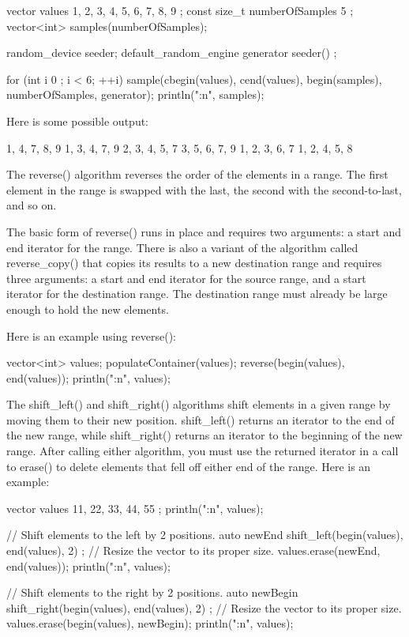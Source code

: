 \begin{cpp}
vector values { 1, 2, 3, 4, 5, 6, 7, 8, 9 };
const size_t numberOfSamples { 5 };
vector<int> samples(numberOfSamples);

random_device seeder;
default_random_engine generator { seeder() };

for (int i { 0 }; i < 6; ++i) {
    sample(cbegin(values), cend(values), begin(samples),
        numberOfSamples, generator);
    println("{:n}", samples);
}
\end{cpp}

Here is some possible output:

\begin{shell}
1, 4, 7, 8, 9
1, 3, 4, 7, 9
2, 3, 4, 5, 7
3, 5, 6, 7, 9
1, 2, 3, 6, 7
1, 2, 4, 5, 8
\end{shell}


The reverse() algorithm reverses the order of the elements in a range. The first element in the range is swapped with the last, the second with the second-to-last, and so on.

The basic form of reverse() runs in place and requires two arguments: a start and end iterator for the range. There is also a variant of the algorithm called reverse\_copy() that copies its results to a new destination range and requires three arguments: a start and end iterator for the source range, and a start iterator for the destination range. The destination range must already be large enough to hold the new elements.

Here is an example using reverse():

\begin{cpp}
vector<int> values;
populateContainer(values);
reverse(begin(values), end(values));
println("{:n}", values);
\end{cpp}


The shift\_left() and shift\_right() algorithms shift elements in a given range by moving them to their new position. shift\_left() returns an iterator to the end of the new range, while shift\_right() returns an iterator to the beginning of the new range. After calling either algorithm, you must use the returned iterator in a call to erase() to delete elements that fell off either end of the range. Here is an example:

\begin{cpp}
vector values { 11, 22, 33, 44, 55 };
println("{:n}", values);

// Shift elements to the left by 2 positions.
auto newEnd { shift_left(begin(values), end(values), 2) };
// Resize the vector to its proper size.
values.erase(newEnd, end(values));
println("{:n}", values);

// Shift elements to the right by 2 positions.
auto newBegin { shift_right(begin(values), end(values), 2) };
// Resize the vector to its proper size.
values.erase(begin(values), newBegin);
println("{:n}", values);
\end{cpp}


